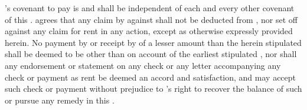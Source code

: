 \lessee's covenant to pay \monthlyRent is and shall be independent of each and every other covenant of this \lease. \lessee agrees that any claim by \lessee against \lessor shall not be deducted from \monthlyRent, nor set off against any claim for rent in any action, except as otherwise expressly provided herein. No payment by \lessee or receipt by \lessor of a lesser amount than the \monthlyRent herein stipulated shall be deemed to be other than on account of the earliest stipulated \monthlyRent, nor shall any endorsement or statement on any check or any letter accompanying any check or payment as rent be deemed an accord and satisfaction, and \lessor may accept such check or payment without prejudice to \lessor's right to recover the balance of such \monthlyRent or pursue any remedy in this \lease.
